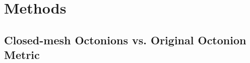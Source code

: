 \documentclass[preprint,12pt]{elsarticle}
\begin{document}

\section{Methods} \label{sec:methods}

\subsection{Closed-mesh Octonions vs. Original Octonion Metric} \label{sec:methods:closed-mesh}
\end{document}

